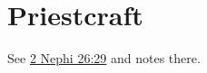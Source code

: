 \section{Priestcraft}
	\label{PRIESTCRAFT}
	
	See \hyperref[2NEPHI-26-29]{2 Nephi 26:29} and notes there.
	




	

	


